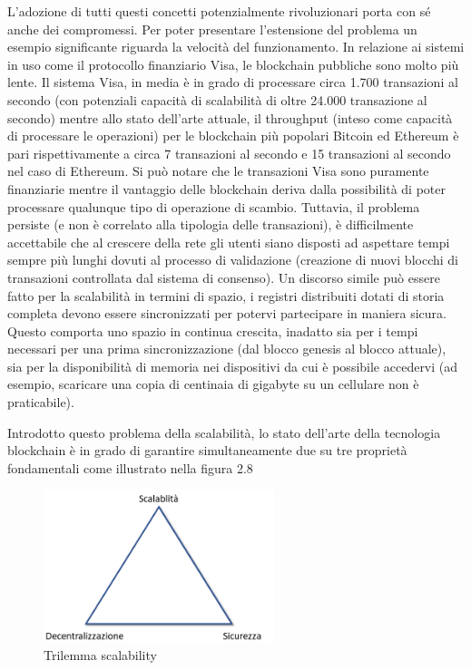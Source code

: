 L'adozione di tutti questi concetti potenzialmente rivoluzionari porta con sé anche dei compromessi. Per poter presentare l’estensione del problema un esempio significante riguarda la velocità del funzionamento. In relazione ai sistemi in uso come il protocollo finanziario Visa, le blockchain pubbliche sono molto più lente. Il sistema Visa, in media è in grado di processare circa 1.700 transazioni al secondo (con potenziali capacità di scalabilità di oltre 24.000 transazione al secondo) mentre allo stato dell’arte attuale, il throughput (inteso come capacità di processare le operazioni) per le blockchain più popolari Bitcoin ed Ethereum è pari rispettivamente a circa 7 transazioni al secondo e 15 transazioni al secondo nel caso di Ethereum. Si può notare che le transazioni Visa sono puramente finanziarie mentre il vantaggio delle blockchain deriva dalla possibilità di poter processare qualunque tipo di operazione di scambio. Tuttavia, il problema persiste (e non è correlato alla tipologia delle transazioni), è difficilmente accettabile che al crescere della rete gli utenti siano disposti ad aspettare tempi sempre più lunghi dovuti al processo di validazione (creazione di nuovi blocchi di transazioni controllata dal sistema di consenso). Un discorso simile può essere fatto per la scalabilità in termini di spazio, i registri distribuiti dotati di storia completa devono essere sincronizzati per potervi partecipare in maniera sicura. Questo comporta uno spazio in continua crescita, inadatto sia per i tempi necessari per una prima sincronizzazione (dal blocco genesis al blocco attuale), sia per la disponibilità di memoria nei dispositivi da cui è possibile accedervi (ad esempio, scaricare una copia di centinaia di gigabyte su un cellulare non è praticabile). 

Introdotto questo problema della scalabilità, lo stato dell’arte della tecnologia blockchain è in grado di garantire simultaneamente due su tre proprietà fondamentali come illustrato nella figura 2.8

\begin{figure}[H]
\centering
\includegraphics[width=0.6\textwidth]{immagini/trilemmascalab.png}
\caption{Trilemma scalability}
\label{fig:TrilemmaScalab}
\end{figure}

